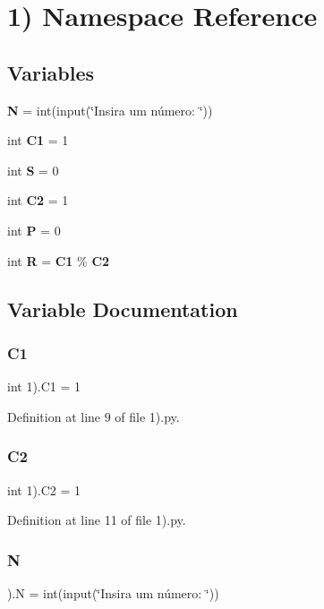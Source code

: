 \section{1) Namespace Reference}
\label{namespace1_08}
\subsection*{Variables}
\begin{DoxyCompactItemize}
\item 
\textbf{ N} = int(input(\char`\"{}Insira um número\+: \char`\"{}))
\item 
int \textbf{ C1} = 1
\item 
int \textbf{ S} = 0
\item 
int \textbf{ C2} = 1
\item 
int \textbf{ P} = 0
\item 
int \textbf{ R} = \textbf{ C1} \% \textbf{ C2}
\end{DoxyCompactItemize}


\subsection{Variable Documentation}
\mbox{\label{namespace1_08_a9e99c9dc9af7563e0c44b443b73d81b4}} 
\subsubsection{C1}
{\footnotesize\ttfamily int 1).C1 = 1}



Definition at line 9 of file 1).\+py.

\mbox{\label{namespace1_08_a339c06e337dc2c330e1c99fa2a6a8a25}} 
\subsubsection{C2}
{\footnotesize\ttfamily int 1).C2 = 1}



Definition at line 11 of file 1).\+py.

\mbox{\label{namespace1_08_aae5e664ccdd985d9ae7dc72d677c5b89}} 
\subsubsection{N}
{\footnotesize{}).N = int(input(\char`\"{}Insira um número\+: \char`\"{}))}




